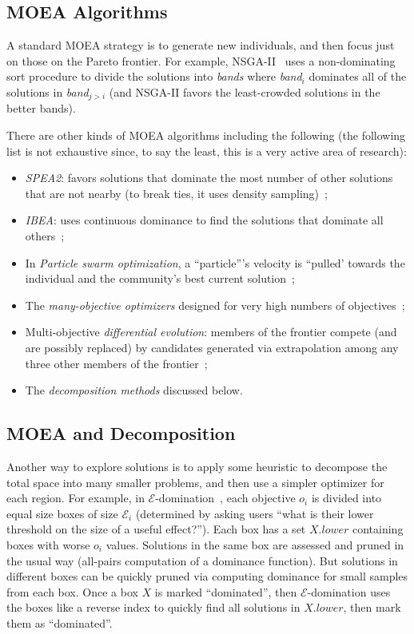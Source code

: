 \documentclass[10pt,journal,compsoc]{IEEEtran}
\newcommand{\bi}{\begin{itemize}}
\newcommand{\ei}{\end{itemize}}
\newenvironment{changed}{\par\color{MyDarkBlue}}{\par}
\begin{document}
\subsection{MOEA Algorithms}\label{sec:algo}
A standard
MOEA strategy is to generate new individuals, and then
focus just on those on the Pareto
frontier. 
For example, 
 NSGA-II~\cite{deb00afast} 
uses a non-dominating sort
procedure to divide the solutions into {\em bands}
where {\em band}$_i$ dominates all of the solutions
in {\em band}$_{j>i}$ (and NSGA-II favors the
least-crowded solutions in the better bands).

\begin{changed}

There are other kinds of MOEA algorithms including the following
(the following list is not
exhaustive since, to say the least,   this is a very
active area of research):
\bi
\item
{\em SPEA2}: favors solutions
that dominate the most number of other solutions
that are not nearby (to break ties, it uses 
density sampling)~\cite{zit02}; 
\item {\em  IBEA}:
uses continuous dominance to find the solutions
that dominate all others~\cite{Zitzler04indicator-basedselection}; 
\item In {\em Particle swarm
  optimization}, a ``particle'''s velocity is 
``pulled' towards the individual and the community's
best current solution~\cite{pan08,V.Sedenka2010,Kennedy:2001:SI:370449,Poli07particleswarm};
\item 
The {\em many-objective
optimizers}  designed for very high
numbers of objectives~\cite{deb14}; 
\item
Multi-objective {\em
differential evolution}: members of
the frontier compete (and are possibly replaced) by
candidates generated via extrapolation among  any three
other members of the frontier~\cite{storn97,5601760};
\item
The {\em decomposition methods} discussed below.
\ei 


\subsection{MOEA and Decomposition}\label{sec:decomp}

Another way to explore solutions is to
apply some heuristic to decompose the total
space into many smaller problems, and then use a simpler
optimizer for each region. For example, in
$\mathcal{E}$-domination~\cite{deb05}, each objective $o_i$ is
divided into equal size boxes of size $\mathcal{E}_i$
(determined by asking users ``what is their lower
threshold on the size of a useful effect?'').  Each
box has a set $X.\mathit{lower}$ containing boxes
with worse $o_i$ values.  Solutions in the same box are
assessed and pruned in the usual way (all-pairs computation
of a dominance function). But solutions in different
boxes can be quickly pruned via computing dominance
for small samples from each box. Once a box $X$ is
marked ``dominated'', then $\mathcal{E}$-domination 
uses the boxes
like a reverse index to 
quickly find all solutions in $X.\mathit{lower}$, then
mark them as ``dominated''.


\end{changed}
\end{document}
